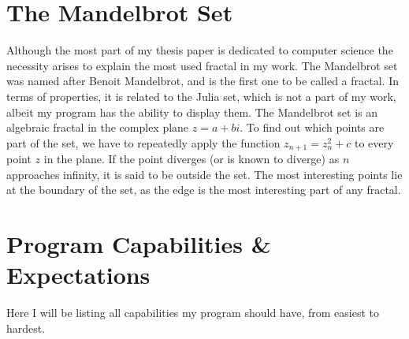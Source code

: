 \documentclass[10pt,a4paper,titlepage]{article}
\begin{document}
	
	\section{The Mandelbrot Set}
	Although the most part of my thesis paper is dedicated to computer science the necessity arises to explain the most used fractal in my work. The Mandelbrot set was named after Benoit Mandelbrot, and is the first one to be called a fractal. In terms of properties, it is related to the Julia set, which is not a part of my work, albeit my program has the ability to display them. The Mandelbrot set is an algebraic fractal in the complex plane \(z = a + b i\). To find out which points are part of the set, we have to repeatedly apply the function \(z_{n+1} = z_{n}^2 + c\) to every point \(z\) in the plane. If the point diverges (or is known to diverge) as \(n\) approaches infinity, it is said to be outside the set. The most interesting points lie at the boundary of the set, as the edge is the most interesting part of any fractal.
	
	
	\section{Program Capabilities \& Expectations}
	Here I will be listing all capabilities my program should have, from easiest to hardest.
\end{document}
